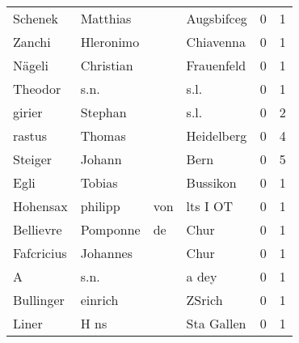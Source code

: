 \begin{tabular}{llllrr}
                  Schenek &                           Matthias &             &                                  Augsbifceg &          0 &         1 \\
                   Zanchi &                          Hleronimo &             &                                   Chiavenna &          0 &         1 \\
                   Nägeli &                          Christian &             &                                  Frauenfeld &          0 &         1 \\
                  Theodor &                               s.n. &             &                                        s.l. &          0 &         1 \\
                   girier &                            Stephan &             &                                        s.l. &          0 &         2 \\
                   rastus &                             Thomas &             &                                  Heidelberg &          0 &         4 \\
                  Steiger &                             Johann &             &                                        Bern &          0 &         5 \\
                     Egli &                             Tobias &             &                                    Bussikon &          0 &         1 \\
                 Hohensax &                            philipp &         von &                                    lts I OT &          0 &         1 \\
                Bellievre &                           Pomponne &          de &                                        Chur &          0 &         1 \\
               Fafcricius &                           Johannes &             &                                        Chur &          0 &         1 \\
                        A &                               s.n. &             &                                       a dey &          0 &         1 \\
                Bullinger &                            einrich &             &                                      ZSrich &          0 &         1 \\
                    Liner &                               H ns &             &                                  Sta Gallen &          0 &         1 \\

\end{tabular}
